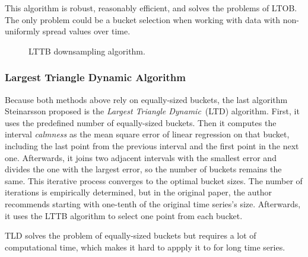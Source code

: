 This algorithm is robust, reasonably efficient, and solves the problems of LTOB. The only problem could be a bucket selection when working with data with non-uniformly spread values over time.

\begin{figure}[htp]
    \centering
    
    \caption{LTTB downsampling algorithm.}
    \label{fig:lttb}
\end{figure}

\subsubsection{Largest Triangle Dynamic Algorithm}
Because both methods above rely on equally-sized buckets, the last algorithm Steinarsson proposed is the \textit{Largest Triangle Dynamic}~(LTD) algorithm. First, it uses the predefined number of equally-sized buckets. Then it computes the interval \textit{calmness} as the mean square error of linear regression on that bucket, including the last point from the previous interval and the first point in the next one. Afterwards, it joins two adjacent intervals with the smallest error and divides the one with the largest error, so the number of buckets remains the same. This iterative process converges to the optimal bucket sizes. The number of iterations is empirically determined, but in the original paper, the author recommends starting with one-tenth of the original time series's size. Afterwards, it uses the LTTB algorithm to select one point from each bucket.

TLD solves the problem of equally-sized buckets but requires a lot of computational time, which makes it hard to appply it to for long time series.


